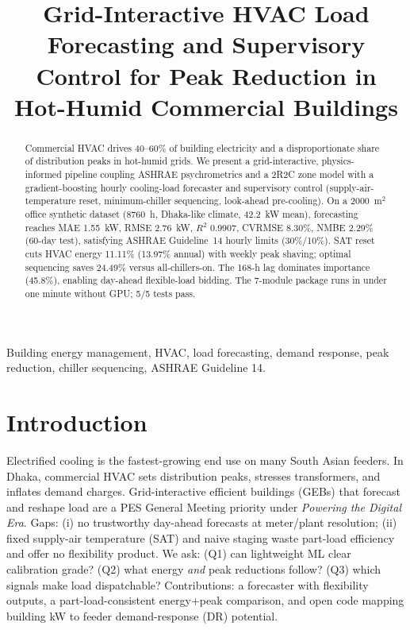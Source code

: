 \documentclass[conference, letterpaper, 10pt]{IEEEtran}
\title{Grid-Interactive HVAC Load Forecasting and Supervisory Control for Peak Reduction in Hot-Humid Commercial Buildings}
\author{\IEEEauthorblockN{Md. Sabbir Hossain}
\IEEEauthorblockA{Independent Researcher, Dhaka, Bangladesh\\
Shuvo.Hossain101@gmail.com}}
\begin{document}
\maketitle

\begin{abstract}
Commercial HVAC drives 40--60\% of building electricity and a disproportionate share of distribution peaks in hot-humid grids. We present a grid-interactive, physics-informed pipeline coupling ASHRAE psychrometrics and a 2R2C zone model with a gradient-boosting hourly cooling-load forecaster and supervisory control (supply-air-temperature reset, minimum-chiller sequencing, look-ahead pre-cooling). On a 2000~m$^2$ office synthetic dataset (8760~h, Dhaka-like climate, 42.2~kW mean), forecasting reaches MAE 1.55~kW, RMSE 2.76~kW, $R^2$ 0.9907, CVRMSE 8.30\%, NMBE 2.29\% (60-day test), satisfying ASHRAE Guideline~14 hourly limits (30\%/10\%). SAT reset cuts HVAC energy 11.11\% (13.97\% annual) with weekly peak shaving; optimal sequencing saves 24.49\% versus all-chillers-on. The 168-h lag dominates importance (45.8\%), enabling day-ahead flexible-load bidding. The 7-module package runs in under one minute without GPU; 5/5 tests pass.
\end{abstract}

\begin{IEEEkeywords}
Building energy management, HVAC, load forecasting, demand response, peak reduction, chiller sequencing, ASHRAE Guideline 14.
\end{IEEEkeywords}

\section{Introduction}
Electrified cooling is the fastest-growing end use on many South Asian feeders. In Dhaka, commercial HVAC sets distribution peaks, stresses transformers, and inflates demand charges. Grid-interactive efficient buildings (GEBs) that forecast and reshape load are a PES General Meeting priority under \textit{Powering the Digital Era}. Gaps: (i) no trustworthy day-ahead forecasts at meter/plant resolution; (ii) fixed supply-air temperature (SAT) and naive staging waste part-load efficiency and offer no flexibility product. We ask: (Q1) can lightweight ML clear calibration grade? (Q2) what energy \textit{and} peak reductions follow? (Q3) which signals make load dispatchable? Contributions: a forecaster with flexibility outputs, a part-load-consistent energy+peak comparison, and open code mapping building kW to feeder demand-response (DR) potential.
\end{document}
